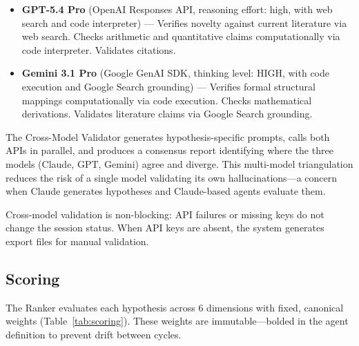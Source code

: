 \begin{itemize}
    \item \textbf{GPT-5.4 Pro} (OpenAI Responses API, reasoning effort: high, with web search and code interpreter) --- Verifies novelty against current literature via web search. Checks arithmetic and quantitative claims computationally via code interpreter. Validates citations.

    \item \textbf{Gemini 3.1 Pro} (Google GenAI SDK, thinking level: HIGH, with code execution and Google Search grounding) --- Verifies formal structural mappings computationally via code execution. Checks mathematical derivations. Validates literature claims via Google Search grounding.
\end{itemize}

The Cross-Model Validator generates hypothesis-specific prompts, calls both APIs in parallel, and produces a consensus report identifying where the three models (Claude, GPT, Gemini) agree and diverge. This multi-model triangulation reduces the risk of a single model validating its own hallucinations---a concern when Claude generates hypotheses and Claude-based agents evaluate them.

Cross-model validation is non-blocking: API failures or missing keys do not change the session status. When API keys are absent, the system generates export files for manual validation.

\subsection{Scoring}
\label{sec:scoring}

The Ranker evaluates each hypothesis across 6 dimensions with fixed, canonical weights (Table~\ref{tab:scoring}). These weights are immutable---bolded in the agent definition to prevent drift between cycles.

